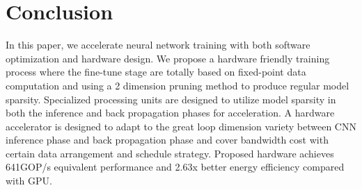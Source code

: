 \section{Conclusion}\label{sec:conclusion}

In this paper, we accelerate neural network training with both software optimization and hardware design. We propose a hardware friendly training process where the fine-tune stage are totally based on fixed-point data computation and using a 2 dimension pruning method to produce regular model sparsity. Specialized processing units are designed to utilize model sparsity in both the inference and back propagation phases for acceleration. A hardware accelerator is designed to adapt to the great loop dimension variety between CNN inference phase and back propagation phase and cover bandwidth cost with certain data arrangement and schedule strategy. Proposed hardware achieves 641GOP/s equivalent performance and 2.63x better energy efficiency compared with GPU. 